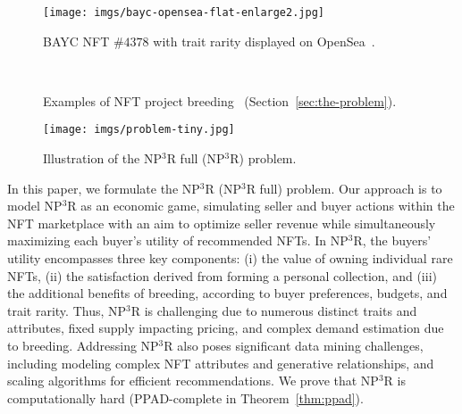 \documentclass[conference]{IEEEtran}
\theoremstyle{plain}
\begin{document}
\begin{figure}
    \centering    
    \texttt{[image: imgs/bayc-opensea-flat-enlarge2.jpg]}
    \vspace{-7mm}
    \caption{
    BAYC NFT $\#4378$ with trait rarity displayed on OpenSea~\cite{opensea}.}
    \vspace{-4mm}
    \label{fig:bayc-example}
\end{figure}

\begin{figure}[t]
    \centering
    \begin{minipage}[b]{0.37\linewidth}
        \centering
        \\[2pt] 
    \end{minipage}

    \begin{minipage}[b]{0.62\linewidth}
        \centering
    \end{minipage}
    \caption{Examples of NFT project breeding~\cite{heterosis, fatape, pann} (Section~\ref{sec:the-problem}).}
    \vspace{-4mm}
    \label{fig:breeding-example}
\end{figure}

\begin{figure*}
  \centering
  \texttt{[image: imgs/problem-tiny.jpg]}
  \vspace{-6mm}

  \caption{Illustration of the NP$^3$R full (NP$^3$R) problem. }
  \vspace{-4mm}
  \label{fig:problem-illustration}
\end{figure*}

In this paper, we formulate the NP$^3$R (NP$^3$R full) problem. Our approach is to model NP$^3$R as an economic game, simulating seller and buyer actions within the NFT marketplace with an aim to optimize seller revenue while simultaneously maximizing each buyer's utility of recommended NFTs. In NP$^3$R, the buyers' utility encompasses three key components: (i) the value of owning individual rare NFTs, (ii) the satisfaction derived from forming a personal collection, and (iii) the additional benefits of breeding, according to buyer preferences, budgets, and trait rarity. Thus, NP$^3$R is challenging due to numerous distinct traits and attributes, fixed supply impacting pricing, and complex demand estimation due to breeding. Addressing NP$^3$R also poses significant data mining challenges, including modeling complex NFT attributes and generative relationships, and scaling algorithms for efficient recommendations. We prove that NP$^3$R is computationally hard (PPAD-complete in Theorem~\ref{thm:ppad}).
\end{document}
